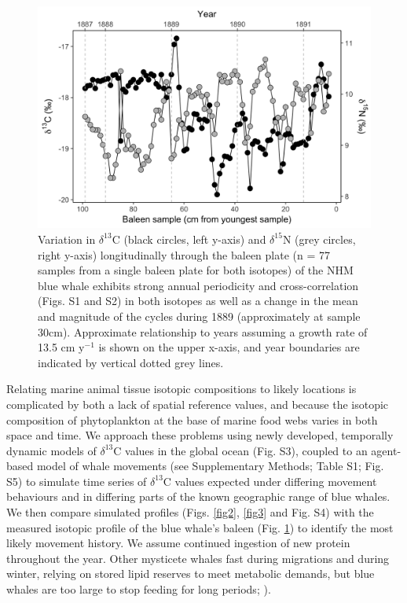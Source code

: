 \documentclass[a4paper,12pt]{article}
\begin{document}
\begin{figure}
  \centering
  \includegraphics[width = \linewidth]{figures/Figure-1-raw-dC-dN-data.png}
  \caption{Variation in $\delta^{13}$C (black circles, left y-axis) and $\delta^{15}$N (grey circles, right y-axis) longitudinally through the baleen plate (n = 77 samples from a single baleen plate for both isotopes) of the NHM blue whale exhibits strong annual periodicity and cross-correlation (Figs. S1 and S2) in both isotopes as well as a change in the mean and magnitude of the cycles during 1889 (approximately at sample 30cm). Approximate relationship to years assuming a growth rate of 13.5 cm y$^{-1}$ is shown on the upper x-axis, and year boundaries are indicated by vertical dotted grey lines.}
  \label{fig1}
\end{figure}


Relating marine animal tissue isotopic compositions to likely locations is complicated by both a lack of spatial reference values, and because the isotopic composition of phytoplankton at the base of marine food webs varies in both space and time. 
We approach these problems using newly developed, temporally dynamic models of $\delta^{13}$C values in the global ocean\cite{magozzi2017using} (Fig. S3), coupled to an agent-based model of whale movements (see Supplementary Methods; Table S1; Fig. S5) to simulate time series of $\delta^{13}$C values expected under differing movement behaviours and in differing parts of the known geographic range of blue whales. 
We then compare simulated profiles (Figs. \ref{fig2}, \ref{fig3} and Fig. S4) with the measured isotopic profile of the blue whale's baleen (Fig. \ref{fig1}) to identify the most likely movement history.
We assume continued ingestion of new protein throughout the year. 
Other mysticete whales fast during migrations and during winter, relying on stored lipid reserves to meet metabolic demands, but blue whales are too large to stop feeding for long periods; \cite{busquets2017estimating,silva2013north}).
\end{document}
